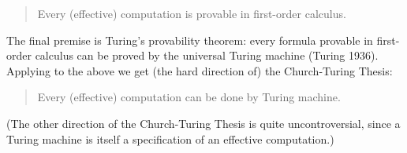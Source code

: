 \documentclass[11pt]{article}
\theoremstyle{definition}
\begin{document}
\begin{quote}
Every (effective) computation is provable in first-order calculus.
\end{quote}

The final premise is Turing’s provability theorem: every formula provable in first-order calculus can be proved by the universal Turing machine (Turing 1936). Applying to the above we get (the hard direction of) the Church-Turing Thesis:

\begin{quote}
Every (effective) computation can be done by Turing machine. 
\end{quote}

(The other direction of the Church-Turing Thesis is quite uncontroversial, since a Turing machine is itself a specification of an effective computation.)
\end{document}

